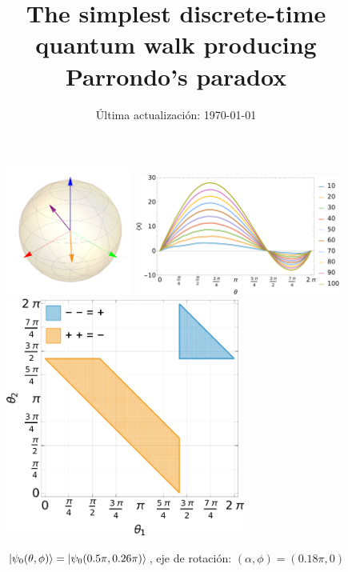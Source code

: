 \documentclass[10pt,letterpaper]{article} %
\title{The simplest discrete-time quantum walk producing Parrondo's paradox}
\author{}
\date{Última actualización: \today}
\begin{document}
\maketitle

\begin{figure}
\centering
\includegraphics[width=0.37\textwidth]{figs/fixed_rotation_axes_bloch_sphere_01.pdf}
\includegraphics[width=0.6\textwidth]{figs/fixed_rotation_axes_expval_01.pdf}
\includegraphics[width=0.7\textwidth]{figs/fixed_rotation_axes_01.pdf}
\caption{$\ket{\psi_0(\theta,\phi)} = \ket{\psi_0(0.5\pi, 0.26\pi)}$, 
eje de rotación: $(\alpha, \phi) = (0.18\pi, 0)$}
\end{figure}





\end{document}
